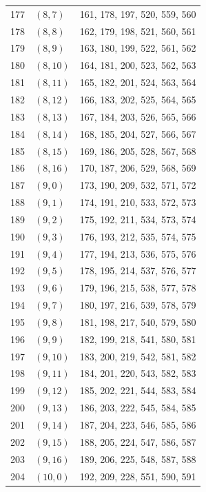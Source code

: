 \documentclass{article}
\begin{document}
\begin{longtable}{lll}
  177 & \((8, 7)\) & 161, 178, 197, 520, 559, 560 \\
  178 & \((8, 8)\) & 162, 179, 198, 521, 560, 561 \\
  179 & \((8, 9)\) & 163, 180, 199, 522, 561, 562 \\
  180 & \((8, 10)\) & 164, 181, 200, 523, 562, 563 \\
  181 & \((8, 11)\) & 165, 182, 201, 524, 563, 564 \\
  182 & \((8, 12)\) & 166, 183, 202, 525, 564, 565 \\
  183 & \((8, 13)\) & 167, 184, 203, 526, 565, 566 \\
  184 & \((8, 14)\) & 168, 185, 204, 527, 566, 567 \\
  185 & \((8, 15)\) & 169, 186, 205, 528, 567, 568 \\
  186 & \((8, 16)\) & 170, 187, 206, 529, 568, 569 \\
  187 & \((9, 0)\) & 173, 190, 209, 532, 571, 572 \\
  188 & \((9, 1)\) & 174, 191, 210, 533, 572, 573 \\
  189 & \((9, 2)\) & 175, 192, 211, 534, 573, 574 \\
  190 & \((9, 3)\) & 176, 193, 212, 535, 574, 575 \\
  191 & \((9, 4)\) & 177, 194, 213, 536, 575, 576 \\
  192 & \((9, 5)\) & 178, 195, 214, 537, 576, 577 \\
  193 & \((9, 6)\) & 179, 196, 215, 538, 577, 578 \\
  194 & \((9, 7)\) & 180, 197, 216, 539, 578, 579 \\
  195 & \((9, 8)\) & 181, 198, 217, 540, 579, 580 \\
  196 & \((9, 9)\) & 182, 199, 218, 541, 580, 581 \\
  197 & \((9, 10)\) & 183, 200, 219, 542, 581, 582 \\
  198 & \((9, 11)\) & 184, 201, 220, 543, 582, 583 \\
  199 & \((9, 12)\) & 185, 202, 221, 544, 583, 584 \\
  200 & \((9, 13)\) & 186, 203, 222, 545, 584, 585 \\
  201 & \((9, 14)\) & 187, 204, 223, 546, 585, 586 \\
  202 & \((9, 15)\) & 188, 205, 224, 547, 586, 587 \\
  203 & \((9, 16)\) & 189, 206, 225, 548, 587, 588 \\
  204 & \((10, 0)\) & 192, 209, 228, 551, 590, 591 \\

\end{longtable}
\end{document}
